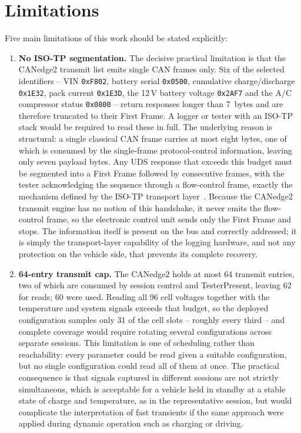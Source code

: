 \documentclass[11pt,a4paper,oneside,parskip=half]{scrreprt}
\providecommand{\hex}{}\renewcommand{\hex}[1]{\texttt{0x#1}}
\begin{document}
\section{Limitations}
Five main limitations of this work should be stated explicitly:

\begin{enumerate}
  \item \textbf{No ISO-TP segmentation.} The decisive practical limitation is that the CANedge2 transmit list emits single CAN frames only. Six of the selected identifiers -- VIN \hex{F802}, battery serial \hex{0500}, cumulative charge/discharge \hex{1E32}, pack current \hex{1E3D}, the 12\,V battery voltage \hex{2AF7} and the A/C compressor status \hex{0800} -- return responses longer than 7~bytes and are therefore truncated to their First Frame. A logger or tester with an ISO-TP stack would be required to read these in full. The underlying reason is structural: a single classical CAN frame carries at most eight bytes, one of which is consumed by the single-frame protocol-control information, leaving only seven payload bytes. Any UDS response that exceeds this budget must be segmented into a First Frame followed by consecutive frames, with the tester acknowledging the sequence through a flow-control frame, exactly the mechanism defined by the ISO-TP transport layer~\cite{iso15765}. Because the CANedge2 transmit engine has no notion of this handshake, it never emits the flow-control frame, so the electronic control unit sends only the First Frame and stops. The information itself is present on the bus and correctly addressed; it is simply the transport-layer capability of the logging hardware, and not any protection on the vehicle side, that prevents its complete recovery.
  \item \textbf{64-entry transmit cap.} The CANedge2 holds at most 64 transmit entries, two of which are consumed by session control and TesterPresent, leaving 62 for reads; 60 were used. Reading all 96 cell voltages together with the temperature and system signals exceeds that budget, so the deployed configuration samples only 31 of the cell slots -- roughly every third -- and complete coverage would require rotating several configurations across separate sessions. This limitation is one of scheduling rather than reachability: every parameter could be read given a suitable configuration, but no single configuration could read all of them at once. The practical consequence is that signals captured in different sessions are not strictly simultaneous, which is acceptable for a vehicle held in standby at a stable state of charge and temperature, as in the representative session, but would complicate the interpretation of fast transients if the same approach were applied during dynamic operation such as charging or driving.

\end{enumerate}
\end{document}
